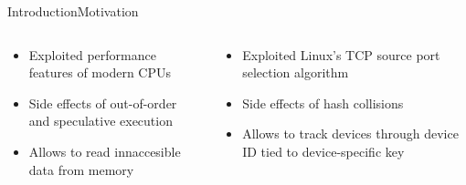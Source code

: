 \documentclass[aspectratio=169, hyperref={colorlinks=true, allcolors=SecondaryColor}, c]{beamer}
\begin{document}
\begin{frame}[fragile]{Introduction}{Motivation}
\begin{columns}
	\end{columns}
	\begin{columns}
		\begin{column}[t]{0.5\textwidth}
			\begin{itemize}
				\item \alert{Exploited} performance features of modern CPUs
				\item \alert{Side effects} of out-of-order and speculative execution
				\item \alert{Allows} to read innaccesible data from memory
			\end{itemize}
		\end{column}
		\begin{column}[t]{0.5\textwidth}
			\begin{itemize}
				\item \alert{Exploited} Linux’s TCP source port selection algorithm
				\item \alert{Side effects} of hash collisions
				\item \alert{Allows} to track devices through device ID tied to device-specific key
			\end{itemize}
		\end{column}
	\end{columns}
\end{frame}
\end{document}
